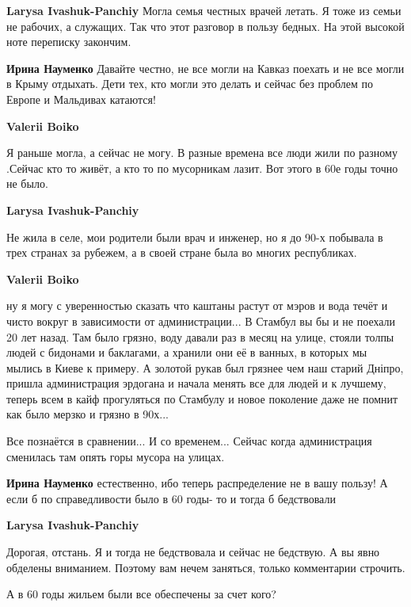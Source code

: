 \begin{itemize}
\begin{itemize}
\begin{itemize}
\textbf{Larysa Ivashuk-Panchiy} Могла семья честных врачей летать. Я тоже из семьи не рабочих, а служащих. Так что этот разговор в пользу бедных. На этой высокой ноте переписку закончим.

\textbf{Ирина Науменко} Давайте честно, не все могли на Кавказ поехать и не все могли в Крыму отдыхать. Дети тех, кто могли это делать и сейчас без проблем по Европе и Мальдивах катаются!

\textbf{Valerii Boiko} 

Я раньше могла, а сейчас не могу. В разные времена все люди жили по разному
.Сейчас кто то живёт, а кто то по мусорникам лазит. Вот этого в 60е годы точно не
было.

\textbf{Larysa Ivashuk-Panchiy} 

Не жила в селе, мои родители были врач и инженер, но я до 90-х побывала в трех
странах за рубежем, а в своей стране была во многих республиках.


\textbf{Valerii Boiko} 

ну я могу с уверенностью сказать что каштаны растут от мэров и вода течёт и
чисто вокруг в зависимости от администрации... В Стамбул вы бы и не поехали 20
лет назад. Там было грязно, воду давали раз в месяц на улице, стояли толпы
людей с бидонами и баклагами, а хранили они её в ванных, в которых мы мылись в
Киеве к примеру. А золотой рукав был грязнее чем наш старий Дніпро, пришла
администрация эрдогана и начала менять все для людей и к лучшему, теперь всем в
кайф прогуляться по Стамбулу и новое поколение даже не помнит как было мерзко и
грязно в 90х...

Все познаётся в сравнении... И со временем... Сейчас когда администрация
сменилась там опять горы мусора на улицах.

\textbf{Ирина Науменко} естественно, ибо теперь распределение не в вашу пользу! А если б по справедливости было в 60 годы- то и тогда б бедствовали

\textbf{Larysa Ivashuk-Panchiy} 

Дорогая, отстань. Я и тогда не бедствовала и сейчас не бедствую. А вы явно
обделены вниманием. Поэтому вам нечем заняться, только комментарии строчить.

\end{itemize} %

А в 60 годы жильем были все обеспечены за счет кого?


\end{itemize}
\end{itemize}
